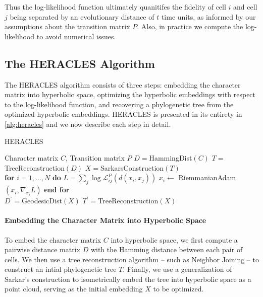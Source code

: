 \documentclass{article}
\begin{document}
Thus the log-likelihood function ultimately quanitifes the fidelity of cell $i$ and cell $j$ being separated by an evolutionary distance of $t$ time units, as informed by our assumptions about the transition matrix $P$. Also, in practice we compute the log-likelihood to avoid numerical issues.

\subsection{The HERACLES Algorithm}

The HERACLES algorithm consists of three steps: embedding the character matrix into hyperbolic space, optimizing the hyperbolic embeddings with respect to the log-likelihood function, and recovering a phylogenetic tree from the optimized hyperbolic embeddings. HERACLES is presented in its entirety in \ref{alg:heracles} and we now describe each step in detail.

\begin{algorithm}[t]
  \caption{HERACLES}
  \label{alg:heracles}
  \begin{algorithmic}
  \Require Character matrix $C$, Transition matrix $P$
  \State $D = $HammingDist$(C)$ 
  \State $T = $TreeReconstruction$(D)$ 
  \State $X = $SarkarsConstruction$(T)$ 
  \\
  \State \textbf{for} $i = 1, \dots, N$ \textbf{do}
  \State \quad $L = \sum_{j} \log \mathcal{L}_{ij}^P\left(d(x_i, x_j) \right)$ 
  \State \quad $x_i \leftarrow$ RiemmanianAdam$(x_i, \nabla_{x_i} L)$ 
  \State \textbf{end for}
  \EndWhile
  \\
  \State $D^\prime = $GeodesicDist$(X)$ 
  \State $T^\prime = $TreeReconstruction$(X)$ 
  \end{algorithmic}
\end{algorithm}

\paragraph*{Embedding the Character Matrix into Hyperbolic Space} To embed the character matrix $C$ into hyperbolic space, we first compute a pairwise distance matrix $D$ with the Hamming distance between each pair of cells. We then use a tree reconstruction algorithm -- such as Neighbor Joining -- to construct an intial phylogenetic tree $T$. Finally, we use a generalization of Sarkar's construction \cite{sarkar2012low} \cite{sala2018representation} to isometrically embed the tree into hyperbolic space as a point cloud, serving as the initial embedding $X$ to be optimized.
\end{document}
